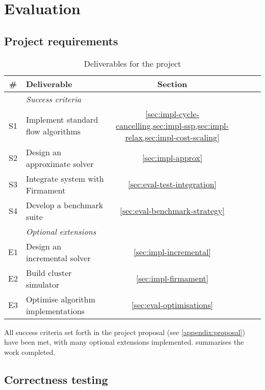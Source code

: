 \chapter{Evaluation} \label{chap:eval}


\section{Project requirements} 

\begin{table}
    \centering
    \begin{tabular}{clcccc}
        \textbf{\#} & \textbf{Deliverable} & \textbf{Section}
        \tabularnewline
        \hline
        & \textit{Success criteria} \tabularnewline
        S1 & Implement standard flow algorithms & \cref{sec:impl-cycle-cancelling,sec:impl-ssp,sec:impl-relax,sec:impl-cost-scaling} \tabularnewline
        S2 & Design an approximate solver & \cref{sec:impl-approx} \tabularnewline
        S3 & Integrate system with Firmament & \cref{sec:eval-test-integration} \tabularnewline
        S4 & Develop a benchmark suite & \cref{sec:eval-benchmark-strategy} \tabularnewline
        \hline
        & \textit{Optional extensions} \tabularnewline
        E1 & Design an incremental solver & \cref{sec:impl-incremental} \tabularnewline
        E2 & Build cluster simulator & \cref{sec:impl-firmament} \tabularnewline
        E3 & Optimise algorithm implementations & \cref{sec:eval-optimisations} \tabularnewline
        \hline
    \end{tabular}
    \crefsections
    \caption{Deliverables for the project}
    \label{table:eval-project-requirements}
\end{table}

All success criteria set forth in the project proposal (see \cref{appendix:proposal}) have been met, with many optional extensions implemented.  summarises the work completed.


\section{Correctness testing}


